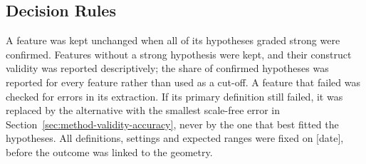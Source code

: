 \subsection{Decision Rules}
\label{sec:method-validity-reading}

A feature was kept unchanged when all of its hypotheses graded strong were confirmed.
Features without a strong hypothesis were kept, and their construct validity was reported descriptively; the share of confirmed hypotheses was reported for every feature rather than used as a cut-off.
A feature that failed was checked for errors in its extraction.
If its primary definition still failed, it was replaced by the alternative with the smallest scale-free error in Section~\ref{sec:method-validity-accuracy}, never by the one that best fitted the hypotheses.
All definitions, settings and expected ranges were fixed on [date], before the outcome was linked to the geometry.
